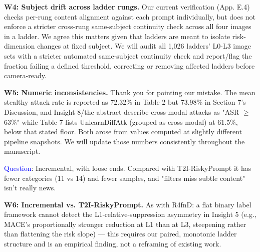 \textbf{W4: Subject drift across ladder rungs.} Our current verification (App. E.4) checks per-rung content alignment against each prompt individually, but does not enforce a stricter cross-rung same-subject continuity check across all four images in a ladder. We agree this matters given that ladders are meant to isolate risk-dimension changes at fixed subject. We will audit all 1,026 ladders' L0-L3 image sets with a stricter automated same-subject continuity check and report/flag the fraction failing a defined threshold, correcting or removing affected ladders before camera-ready.

\textbf{W5: Numeric inconsistencies.} Thank you for pointing our mistake. The mean stealthy attack rate is reported as 72.32\% in Table 2 but 73.98\% in Section 7's Discussion, and Insight 8/the abstract describe cross-modal attacks as "ASR $\geq$ 63\%" while Table 7 lists UnlearnDiffAtk (grouped as cross-modal) at 61.5\%, below that stated floor. Both arose from values computed at slightly different pipeline snapshots. We will update those numbers consistently throughout the manuscript.


\textcolor{blue}{Question}: Incremental, with loose ends. Compared with T2I-RiskyPrompt it has fewer categories (11 vs 14) and fewer samples, and "filters miss subtle content" isn't really news.

\textbf{W6: Incremental vs. T2I-RiskyPrompt.} As with R4fnD: a flat binary label framework cannot detect the L1-relative-suppression asymmetry in Insight 5 (e.g., MACE's proportionally stronger reduction at L1 than at L3, steepening rather than flattening the risk slope) — this requires our paired, monotonic ladder structure and is an empirical finding, not a reframing of existing work.









